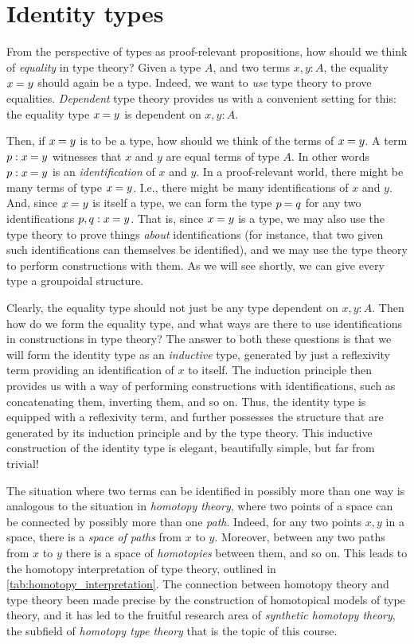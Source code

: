 \section{Identity types}\label{chap:identity}
From the perspective of types as proof-relevant propositions, how should we think of \emph{equality} in type theory? Given a type $A$, and two terms $x,y:A$, the equality $\id{x}{y}$ should again be a type. Indeed, we want to \emph{use} type theory to prove equalities. \emph{Dependent} type theory provides us with a convenient setting for this: the equality type $\id{x}{y}$ is dependent on $x,y:A$. 

Then, if $\id{x}{y}$ is to be a type, how should we think of the terms of $\id{x}{y}$. A term $p:\id{x}{y}$ witnesses that $x$ and $y$ are equal terms of type $A$. In other words $p:\id{x}{y}$ is an \emph{identification} of $x$ and $y$. In a proof-relevant world, there might be many terms of type $\id{x}{y}$. I.e., there might be many identifications of $x$ and $y$. And, since $\id{x}{y}$ is itself a type, we can form the type $\id{p}{q}$ for any two identifications $p,q:\id{x}{y}$. That is, since $\id{x}{y}$ is a type, we may also use the type theory to prove things \emph{about} identifications (for instance, that two given such identifications can themselves be identified), and we may use the type theory to perform constructions with them. As we will see shortly, we can give every type a groupoidal structure.

Clearly, the equality type should not just be any type dependent on $x,y:A$. Then how do we form the equality type, and what ways are there to use identifications in constructions in type theory? The answer to both these questions is that we will form the identity type as an \emph{inductive} type, generated by just a reflexivity term providing an identification of $x$ to itself. The induction principle then provides us with a way of performing constructions with identifications, such as concatenating them, inverting them, and so on. Thus, the identity type is equipped with a reflexivity term, and further possesses the structure that are generated by its induction principle and by the type theory. This inductive construction of the identity type is elegant, beautifully simple, but far from trivial!

The situation where two terms can be identified in possibly more than one way is analogous to the situation in \emph{homotopy theory}, where two points of a space can be connected by possibly more than one \emph{path}. Indeed, for any two points $x,y$ in a space, there is a \emph{space of paths} from $x$ to $y$. Moreover, between any two paths from $x$ to $y$ there is a space of \emph{homotopies} between them, and so on. This leads to the homotopy interpretation of type theory, outlined in \cref{tab:homotopy_interpretation}. The connection between homotopy theory and type theory been made precise by the construction of homotopical models of type theory, and it has led to the fruitful research area of \emph{synthetic homotopy theory}, the subfield of \emph{homotopy type theory} that is the topic of this course.

